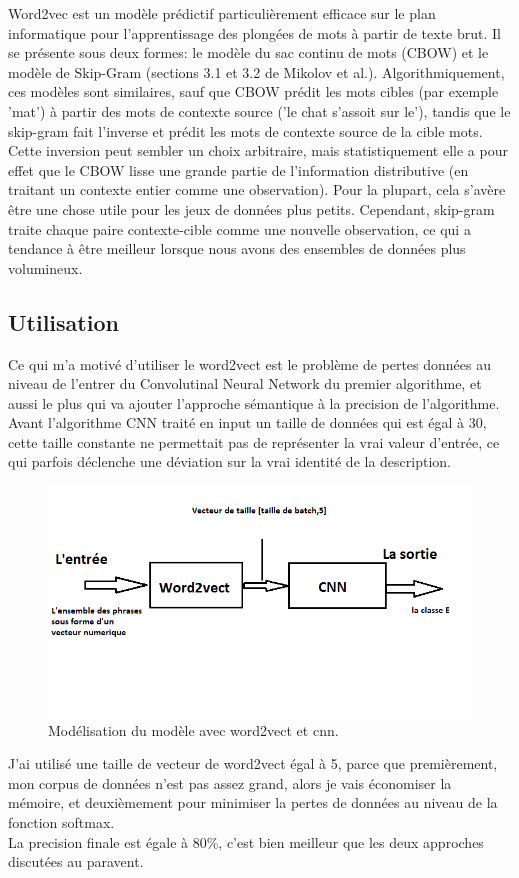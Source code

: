 Word2vec est un modèle prédictif particulièrement efficace sur le plan informatique pour l'apprentissage des plongées de mots à partir de texte brut. Il se présente sous deux formes: le modèle du sac continu de mots (CBOW) et le modèle de Skip-Gram (sections 3.1 et 3.2 de Mikolov et al.). Algorithmiquement, ces modèles sont similaires, sauf que CBOW prédit les mots cibles (par exemple 'mat') à partir des mots de contexte source ('le chat s'assoit sur le'), tandis que le skip-gram fait l'inverse et prédit les mots de contexte source de la cible mots. Cette inversion peut sembler un choix arbitraire, mais statistiquement elle a pour effet que le CBOW lisse une grande partie de l'information distributive (en traitant un contexte entier comme une observation). Pour la plupart, cela s'avère être une chose utile pour les jeux de données plus petits. Cependant, skip-gram traite chaque paire contexte-cible comme une nouvelle observation, ce qui a tendance à être meilleur lorsque nous avons des ensembles de données plus volumineux.
\subsection{Utilisation}
Ce qui m'a motivé d'utiliser le word2vect est le problème de pertes données au niveau de l'entrer du Convolutinal Neural Network du premier algorithme, et aussi le plus qui va ajouter l'approche sémantique à la precision de l'algorithme.\\
Avant l'algorithme CNN traité en input un taille de données qui est égal à 30, cette taille constante ne permettait pas de représenter la vrai valeur d'entrée, ce qui parfois déclenche une déviation sur la vrai identité de la description.\\[0.5cm]
\begin{figure}[H]
	\begin{center}
	\includegraphics[width=\linewidth]{Images/w2vcnn.png}
	\end{center}
	\caption{Modélisation du modèle avec word2vect et cnn.}
	\label{fig:rnn}
\end{figure}
J'ai utilisé une taille de vecteur de word2vect égal à 5, parce que premièrement, mon corpus de données n'est pas assez grand, alors je vais économiser la mémoire, et deuxièmement pour minimiser la pertes de données au niveau de la fonction softmax.\\
La precision finale est égale à 80\%, c'est bien meilleur que les deux approches discutées au paravent.




